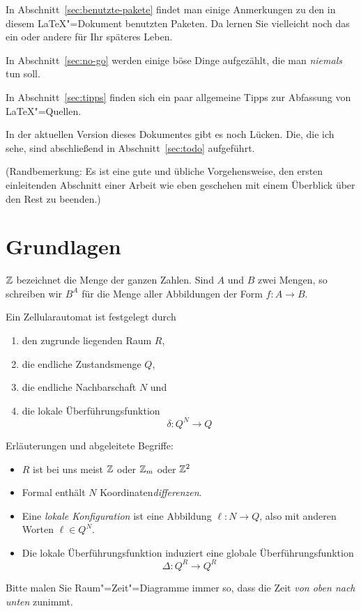 In Abschnitt~\ref{sec:benutzte-pakete} findet man einige Anmerkungen zu den in
diesem \LaTeX"=Dokument benutzten Paketen. Da lernen Sie vielleicht noch das
ein oder andere für Ihr späteres Leben.

In Abschnitt~\ref{sec:no-go} werden einige böse Dinge aufgezählt, die man
\emph{niemals} tun soll.

In Abschnitt~\ref{sec:tipps} finden sich ein paar allgemeine Tipps zur
Abfassung von \LaTeX"=Quellen.

In der aktuellen Version dieses Dokumentes gibt es noch Lücken. Die, die ich
sehe, sind abschließend in Abschnitt~\ref{sec:todo} aufgeführt.

(Randbemerkung: Es ist eine gute und übliche Vorgehensweise, den ersten
einleitenden Abschnitt einer Arbeit wie eben geschehen mit einem Überblick
über den Rest zu beenden.)

\section{Grundlagen}
\label{sec:grundlagen}

$\mathbb{Z}$ bezeichnet die Menge der ganzen Zahlen. Sind $A$ und $B$ zwei Mengen, so
schreiben wir $B^A$ für die Menge aller Abbildungen der Form $f \colon A\to
B$.

Ein Zellularautomat ist festgelegt durch
%
\begin{enumerate}[noitemsep]
\item den zugrunde liegenden Raum $R$,
\item die endliche Zustandsmenge $Q$,
\item die endliche Nachbarschaft $N$ und
\item die lokale Überführungsfunktion
  \[
  \delta: Q^N \to Q
  \]
\end{enumerate}
%
Erläuterungen und abgeleitete Begriffe:
%
\begin{itemize}[noitemsep]
\item $R$ ist bei uns meist $\mathbb{Z}$ oder $\mathbb{Z}_m$ oder $\mathbb{Z}^2$
\item Formal enthält $N$ Koordinaten\emph{differenzen}.
\item Eine \emph{lokale Konfiguration} ist eine Abbildung $\ell:N\to Q$, also
  mit anderen Worten $\ell\in Q^N$.
\item Die lokale Überführungsfunktion induziert eine globale
  Überführungsfunktion
  \[
  \Delta: Q^R \to Q^R
  \]
\end{itemize}
%
Bitte malen Sie Raum"=Zeit"=Diagramme immer so, dass die Zeit \emph{von oben
  nach unten} zunimmt.


